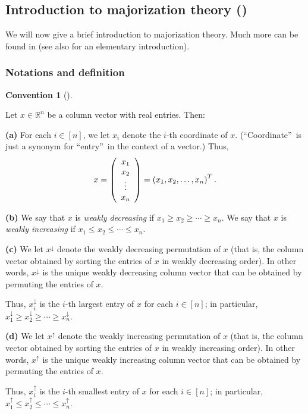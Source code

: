 \documentclass[numbers=enddot,12pt,final,onecolumn,notitlepage]{scrartcl}%
\numberwithin{exer}{subsection}
\theoremstyle{definition}
\newtheorem{conv}[theo]{Convention}
\newenvironment{convention}[1][]
{\begin{conv}[#1]\begin{leftbar}}
{\end{leftbar}\end{conv}}
\begin{document}
\subsection{Introduction to majorization theory (\cite[\S 4.3]{HorJoh13})}

We will now give a brief introduction to majorization theory. Much more can be
found in \cite{MaOlAr11} (see also \cite{Nathan21} for an elementary introduction).

\subsubsection{Notations and definition}

\begin{convention}
\label{conv.major.notations}Let $x\in\mathbb{R}^{n}$ be a column vector with
real entries. Then:

\textbf{(a)} For each $i\in\left[  n\right]  $, we let $x_{i}$ denote the
$i$-th coordinate of $x$. (\textquotedblleft Coordinate\textquotedblright\ is
just a synonym for \textquotedblleft entry\textquotedblright\ in the context
of a vector.) Thus,%
\[
x=\left(
\begin{array}
[c]{c}%
x_{1}\\
x_{2}\\
\vdots\\
x_{n}%
\end{array}
\right)  =\left(  x_{1},x_{2},\ldots,x_{n}\right)  ^{T}.
\]


\textbf{(b)} We say that $x$ is \emph{weakly decreasing} if $x_{1}\geq
x_{2}\geq\cdots\geq x_{n}$. We say that $x$ is \emph{weakly increasing} if
$x_{1}\leq x_{2}\leq\cdots\leq x_{n}$.

\textbf{(c)} We let $x^{\downarrow}$ denote the weakly decreasing permutation
of $x$ (that is, the column vector obtained by sorting the entries of $x$ in
weakly decreasing order). In other words, $x^{\downarrow}$ is the unique
weakly decreasing column vector that can be obtained by permuting the entries
of $x$.

Thus, $x_{i}^{\downarrow}$ is the $i$-th largest entry of $x$ for each
$i\in\left[  n\right]  $; in particular, $x_{1}^{\downarrow}\geq
x_{2}^{\downarrow}\geq\cdots\geq x_{n}^{\downarrow}$.

\textbf{(d)} We let $x^{\uparrow}$ denote the weakly increasing permutation of
$x$ (that is, the column vector obtained by sorting the entries of $x$ in
weakly increasing order). In other words, $x^{\uparrow}$ is the unique weakly
increasing column vector that can be obtained by permuting the entries of $x$.

Thus, $x_{i}^{\uparrow}$ is the $i$-th smallest entry of $x$ for each
$i\in\left[  n\right]  $; in particular, $x_{1}^{\uparrow}\leq x_{2}%
^{\uparrow}\leq\cdots\leq x_{n}^{\uparrow}$.
\end{convention}
\end{document}
